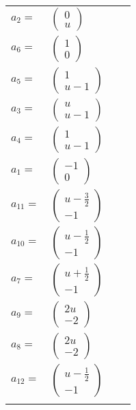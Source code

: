 \documentclass[1p]{elsarticle_modified}
\theoremstyle{definition}
\begin{document}
\begin{tabular}{m{7pt} m{180pt} m{7pt} m{180pt} }
\flushright $a_{2}=$&$\begin{pmatrix}0\\u\end{pmatrix}$ \\
\flushright $a_{6}=$&$\begin{pmatrix}1\\0\end{pmatrix}$ \\
\flushright $a_{5}=$&$\begin{pmatrix}1\\u-1\end{pmatrix}$ \\
\flushright $a_{3}=$&$\begin{pmatrix}u\\u-1\end{pmatrix}$ \\
\flushright $a_{4}=$&$\begin{pmatrix}1\\u-1\end{pmatrix}$ \\
\flushright $a_{1}=$&$\begin{pmatrix}-1\\0\end{pmatrix}$ \\
\flushright $a_{11}=$&$\begin{pmatrix}u-\frac{3}{2}\\-1\end{pmatrix}$ \\
\flushright $a_{10}=$&$\begin{pmatrix}u-\frac{1}{2}\\-1\end{pmatrix}$ \\
\flushright $a_{7}=$&$\begin{pmatrix}u+\frac{1}{2}\\-1\end{pmatrix}$ \\
\flushright $a_{9}=$&$\begin{pmatrix}2 u\\-2\end{pmatrix}$ \\
\flushright $a_{8}=$&$\begin{pmatrix}2 u\\-2\end{pmatrix}$ \\
\flushright $a_{12}=$&$\begin{pmatrix}u-\frac{1}{2}\\-1\end{pmatrix}$\\&\end{tabular}
\end{document}
